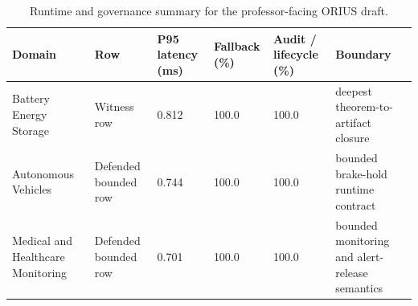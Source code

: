 \begin{table}[t]
\centering
\scriptsize
\caption{Runtime and governance summary for the professor-facing ORIUS draft.}
\label{tab:prof-runtime-governance}
\begin{tabularx}{\textwidth}{@{}p{}p{}p{}p{}p{}p{}@{}}
\toprule
\textbf{Domain} & \textbf{Row} & \textbf{P95 latency (ms)} & \textbf{Fallback (\%)} & \textbf{Audit / lifecycle (\%)} & \textbf{Boundary} \\
\midrule
Battery Energy Storage & Witness row & 0.812 & 100.0 & 100.0 & deepest theorem-to-artifact closure\\
Autonomous Vehicles & Defended bounded row & 0.744 & 100.0 & 100.0 & bounded brake-hold runtime contract\\
Medical and Healthcare Monitoring & Defended bounded row & 0.701 & 100.0 & 100.0 & bounded monitoring and alert-release semantics\\
\bottomrule
\end{tabularx}
\end{table}
